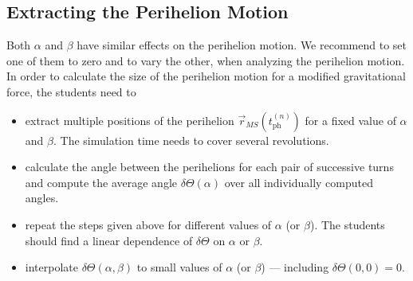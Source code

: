 \documentclass[12pt,ngerman,american]{iopart}
\begin{document}
\subsection{Extracting the Perihelion Motion}

Both $\alpha$ and $\beta$ have similar effects on the perihelion motion.
We recommend to set one of them to zero and to vary the other, when analyzing the perihelion motion.
In order to calculate the size of the perihelion motion for a modified gravitational force, the students need to
\begin{itemize}
\item extract multiple positions of the perihelion $\vec r_{MS} ( t_\mathrm{ph}^{(n)} )$ for a fixed value of $\alpha$ and $\beta$. The  simulation time needs to cover several revolutions.
\item calculate the angle between the perihelions for each pair of successive turns and compute the average angle $\delta \Theta (\alpha)$ over all individually computed angles.
\item repeat the steps given above for different values of $\alpha$ (or $\beta$). The students should find a linear dependence of $\delta \Theta$ on $\alpha$ or $\beta$.
\item interpolate $\delta \Theta (\alpha, \beta)$ to small values of $\alpha$ (or $\beta$) --- including  $\delta \Theta(0,0)=0$.
\end{itemize}
\end{document}
